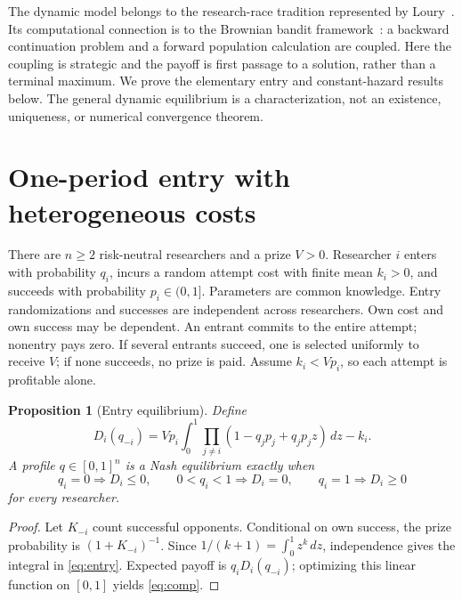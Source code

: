 \documentclass[11pt]{article}
\newtheorem{proposition}{Proposition}
\begin{document}
The dynamic model belongs to the research-race tradition represented by
Loury~\cite{loury}. Its computational connection is to the Brownian bandit
framework~\cite{cotton}: a backward continuation problem and a forward
population calculation are coupled. Here the coupling is strategic and
the payoff is first passage to a solution, rather than a terminal maximum.
We prove the elementary entry and constant-hazard results below. The
general dynamic equilibrium is a characterization, not an existence,
uniqueness, or numerical convergence theorem.

\section{One-period entry with heterogeneous costs}
There are $n\ge2$ risk-neutral researchers and a prize $V>0$. Researcher
$i$ enters with probability $q_i$, incurs a random attempt cost with finite
mean $k_i>0$, and succeeds with probability $p_i\in(0,1]$. Parameters are
common knowledge. Entry randomizations and successes are independent
across researchers. Own cost and own success may be dependent. An entrant
commits to the entire attempt; nonentry pays zero. If several entrants
succeed, one is selected uniformly to receive $V$; if none succeeds, no
prize is paid. Assume $k_i<Vp_i$, so each attempt is profitable alone.

\begin{proposition}[Entry equilibrium]\label{prop:entry}
Define
\begin{equation}\label{eq:entry}
D_i(q_{-i})=Vp_i\int_0^1\prod_{j\ne i}
 (1-q_jp_j+q_jp_jz)\,dz-k_i.
\end{equation}
A profile $q\in[0,1]^n$ is a Nash equilibrium exactly when
\begin{equation}\label{eq:comp}
q_i=0\Rightarrow D_i\le0,\qquad
0<q_i<1\Rightarrow D_i=0,\qquad
q_i=1\Rightarrow D_i\ge0
\end{equation}
for every researcher.
\end{proposition}
\begin{proof}
Let $K_{-i}$ count successful opponents. Conditional on own success, the
prize probability is $(1+K_{-i})^{-1}$. Since
$1/(k+1)=\int_0^1z^k\,dz$, independence gives the integral in
\eqref{eq:entry}. Expected payoff is $q_iD_i(q_{-i})$; optimizing this
linear function on $[0,1]$ yields \eqref{eq:comp}.
\end{proof}
\end{document}
